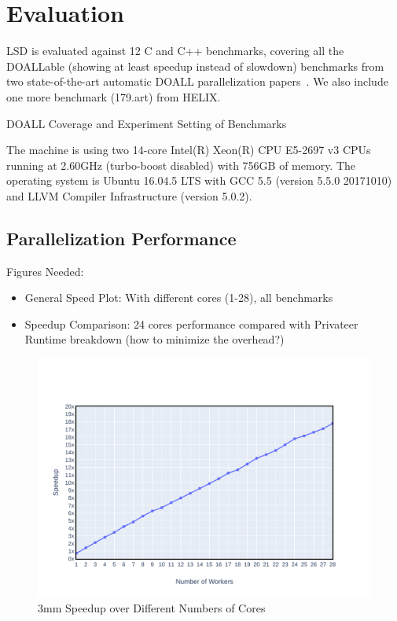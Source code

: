 \section{Evaluation}

LSD is evaluated against 12 C and C++ benchmarks, covering all the DOALLable
(showing at least speedup instead of slowdown) benchmarks from two
state-of-the-art automatic DOALL parallelization
papers~\cite{johnson:12:pldi,kim:12:cgo}. We also include one more benchmark
(179.art) from HELIX.

\begin{table}
  
  \caption{
    DOALL Coverage and Experiment Setting of Benchmarks
  }
  \label{tab:benchmark-list}
    \vspace{-5pt}
\end{table}

The machine is using two 14-core Intel(R) Xeon(R)
CPU E5-2697 v3 CPUs running at 2.60GHz (turbo-boost disabled) with 756GB of
memory. The operating system is Ubuntu 16.04.5 LTS with GCC 5.5 (version 5.5.0
20171010) and LLVM Compiler
Infrastructure (version 5.0.2).


\subsection{Parallelization Performance}
Figures Needed:
\begin{itemize}
\item General Speed Plot: With different cores (1-28), all benchmarks
\item Speedup Comparison: 24 cores performance compared with Privateer
Runtime breakdown (how to minimize the overhead?)

\end{itemize}

\begin{figure}[htp]
  \includegraphics[width=\textwidth]{figures/3mm-scale-crop}
  \caption{3mm Speedup over Different Numbers of Cores}
  \label{fig:3mm-scale}
\end{figure}


